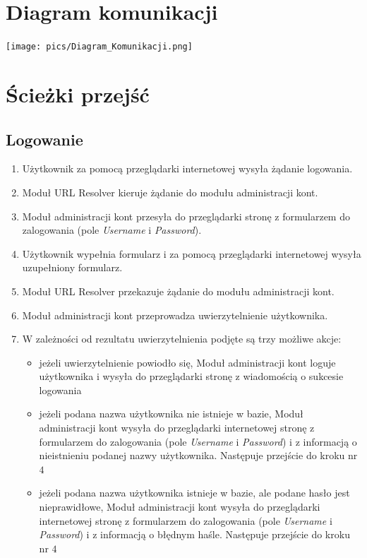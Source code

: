 \documentclass[pdflatex,11pt]{../aghdoc_version2}
\begin{document}
\section{Diagram komunikacji}
\begin{center}
\centerline{\texttt{[image: pics/Diagram\_Komunikacji.png]}}
\end{center}

\section{Ścieżki przejść}
\subsection{Logowanie}
\begin{enumerate}
\item Użytkownik za pomocą przeglądarki internetowej wysyła żądanie logowania.
\item Moduł URL Resolver kieruje żądanie do modułu administracji kont.
\clearpage
\item Moduł administracji kont przesyła do przeglądarki stronę z formularzem do
zalogowania (pole \textit{Username} i \textit{Password}).
\item Użytkownik wypełnia formularz i za pomocą przeglądarki internetowej wysyła
uzupełniony formularz.
\item Moduł URL Resolver przekazuje żądanie do modułu administracji kont.
\item Moduł administracji kont przeprowadza uwierzytelnienie użytkownika.
\item W zależności od rezultatu uwierzytelnienia podjęte są trzy możliwe akcje:
	\begin{itemize}
	\item jeżeli uwierzytelnienie powiodło się, Moduł administracji kont loguje użytkownika 		i wysyła do
	przeglądarki stronę z wiadomością o sukcesie logowania
	\item jeżeli podana nazwa użytkownika nie istnieje w bazie, Moduł administracji kont 			wysyła do
	przeglądarki internetowej stronę z formularzem do zalogowania (pole
	\textit{Username} i \textit{Password}) i z informacją o nieistnieniu podanej nazwy
	użytkownika. Następuje przejście do kroku nr $4$
	\item jeżeli podana nazwa użytkownika istnieje w bazie, ale podane hasło jest
nieprawidłowe, Moduł administracji kont wysyła do przeglądarki internetowej stronę z
formularzem do zalogowania (pole \textit{Username} i \textit{Password}) i z informacją o
błędnym haśle. Następuje przejście do kroku nr $4$
	\end{itemize}
\end{enumerate}
\end{document}
